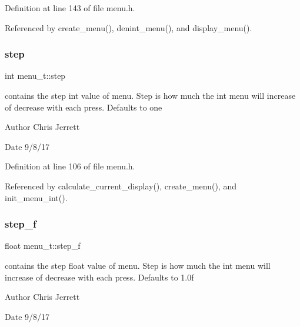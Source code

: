Definition at line 143 of file menu.\+h.



Referenced by create\+\_\+menu(), denint\+\_\+menu(), and display\+\_\+menu().

\mbox{\label{structmenu__t_adc50450bc59ea66a8d67424adc46e24e}} 
\subsubsection{\texorpdfstring{step}{step}}
{\footnotesize\ttfamily int menu\+\_\+t\+::step}



contains the step int value of menu. Step is how much the int menu will increase of decrease with each press. Defaults to one 

\begin{DoxyAuthor}{Author}
Chris Jerrett 
\end{DoxyAuthor}
\begin{DoxyDate}{Date}
9/8/17 
\end{DoxyDate}


Definition at line 106 of file menu.\+h.



Referenced by calculate\+\_\+current\+\_\+display(), create\+\_\+menu(), and init\+\_\+menu\+\_\+int().

\mbox{\label{structmenu__t_a84cfd9226f6554c63ca9f4b11f94d12d}} 
\subsubsection{\texorpdfstring{step\+\_\+f}{step\_f}}
{\footnotesize\ttfamily float menu\+\_\+t\+::step\+\_\+f}



contains the step float value of menu. Step is how much the int menu will increase of decrease with each press. Defaults to 1.\+0f 

\begin{DoxyAuthor}{Author}
Chris Jerrett 
\end{DoxyAuthor}
\begin{DoxyDate}{Date}
9/8/17 
\end{DoxyDate}


